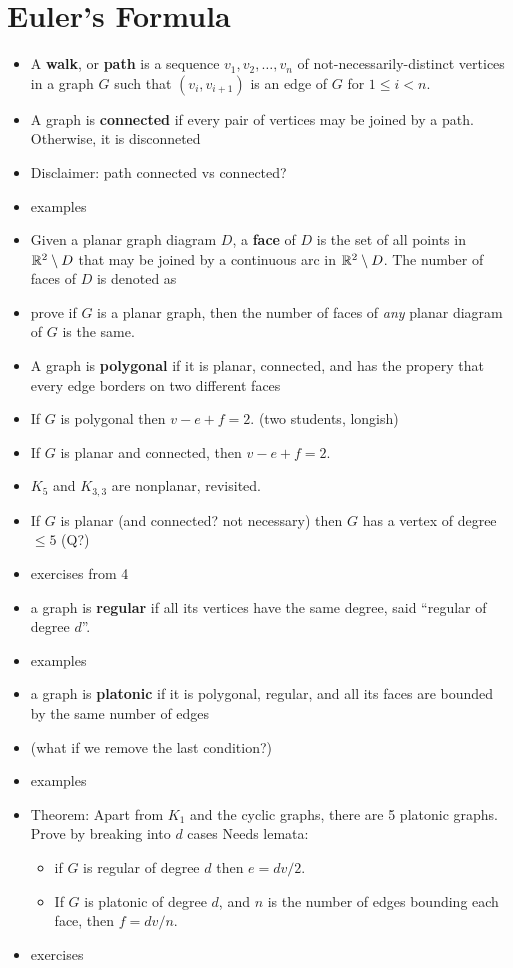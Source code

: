 \section{Euler's Formula}
\begin{itemize}
    \item A \textbf{walk}, or \textbf{path} is a sequence $v_1, v_2, \ldots, v_n$ of not-necessarily-distinct vertices in a graph $G$ such that $(v_i, v_{i+1})$ is an edge of $G$ for $1\leq i <n$.
    \item A graph is \textbf{connected} if every pair of vertices may be joined by a path.  Otherwise, it is disconneted
    \item Disclaimer: path connected vs connected?
    \item examples
    \item Given a planar graph diagram $D$, a \textbf{face} of $D$ is the set of all points in $\mathbb{R}^2 \setminus D$ that may be joined by a continuous arc in $\mathbb{R}^2 \setminus D$.  The number of faces of $D$ is denoted as
    \item prove if $G$ is a planar graph, then the number of faces of \textit{any} planar diagram of $G$ is the same.
    \item A graph is \textbf{polygonal} if it is planar, connected, and has the propery that every edge borders on two different faces
    \item If $G$ is polygonal then $v-e+f = 2$. (two students, longish)
    \item If $G$ is planar and connected, then $v-e+f = 2$.
    \item $K_5$ and $K_{3,3}$ are nonplanar, revisited.
    \item If $G$ is planar (and connected? not necessary) then $G$ has a vertex of degree $\leq 5$ (Q?)
    \item exercises from 4
    \item a graph is \textbf{regular} if all its vertices have the same degree, said ``regular of degree $d$''.
    \item examples
    \item a graph is \textbf{platonic} if it is polygonal, regular, and all its faces are bounded by the same number of edges
    \item (what if we remove the last condition?)
    \item examples
    \item Theorem: Apart from $K_1$ and the cyclic graphs, there are 5 platonic graphs.  Prove by breaking into $d$ cases Needs lemata:
    \begin{itemize}
        \item if $G$ is regular of degree $d$ then $e=dv/2$.
        \item If $G$ is platonic of degree $d$, and $n$ is the number of edges bounding each face, then $f = dv/n$.
    \end{itemize}
    \item exercises
\end{itemize}
